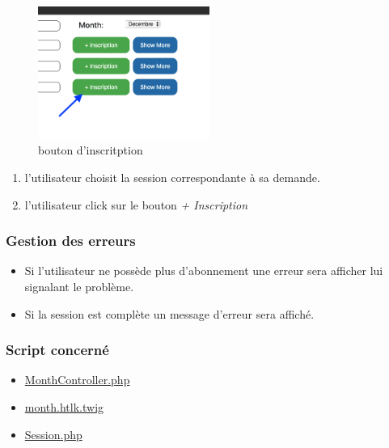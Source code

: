 \begin{figure}[!h]
	\includegraphics[width=0.5\textwidth,center]{Figures/us3-1}
	\caption{bouton d'inscritption}
\end{figure}

\begin{enumerate}
	\item l'utilisateur choisit la session correspondante à sa demande.
	\item l'utilisateur click sur le bouton  \textit{+ Inscription}
\end{enumerate}

\subsubsection{Gestion des erreurs}
	\begin{itemize}
		\item Si l'utilisateur ne possède plus d'abonnement une erreur sera afficher lui signalant le problème. 
		\item Si la session est complète un message d'erreur sera affiché. 
	\end{itemize}
	
\newpage
\subsubsection{Script concerné}
	\begin{itemize}
		\item \href{https://github.com/victorsmits/Aquabike/blob/master/Symfony-Twig/src/Controller/MonthController.php}{MonthController.php}
		\item \href{https://github.com/victorsmits/Aquabike/blob/master/Symfony-Twig/templates/month/month.html.twig}{month.htlk.twig}
		\item \href{https://github.com/victorsmits/Aquabike/blob/master/Symfony-Twig/src/Entity/Session.php}{Session.php}
	\end{itemize}